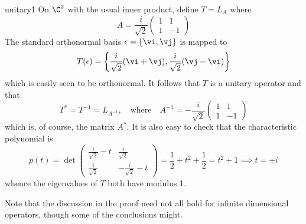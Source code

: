\begin{example}{}{unitary1}
On $\C^2$ with the usual inner product, define $T=L_A$ where
\[A=\frac i{\sqrt 2}\begin{pmatrix}1&1\\1&-1\end{pmatrix}\]
The standard orthonormal basis $\epsilon=\{\vi,\vj\}$ is mapped to
  \[T(\epsilon)=\left\{\frac i{\sqrt 2}(\vi+\vj),\frac i{\sqrt 2}(\vj-\vi)\right\}\]
  which is easily seen to be orthonormal. It follows that $T$ is a unitary operator and that
  \[T^*=T^{-1}=L_{A^{-1}},\quad\text{where}\quad A^{-1}=-\frac i{\sqrt 2}\begin{pmatrix}1&1\\1&-1\end{pmatrix}\]
  which is, of course, the matrix $A^*$. It is also easy to check that the characteristic polynomial is
  \[p(t)=\det\begin{pmatrix}
  \frac i{\sqrt 2}-t&\frac i{\sqrt 2}\\
  \frac i{\sqrt 2}&-\frac i{\sqrt 2}-t
  \end{pmatrix} =\frac 12+t^2+\frac 12=t^2+1\implies t=\pm i\]
  whence the eigenvalues of $T$ both have modulus 1.
\end{example}
\vspace{20pt}


Note that the discussion in the proof need not all hold for infinite dimensional operators, though some of the conclusions might.

